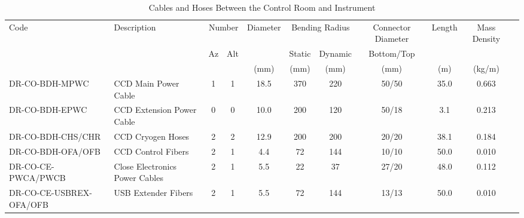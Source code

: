 \documentclass{article}
\begin{document}
%
%
%
%

\begin{landscape}
\begin{table}[p]
\caption{Cables and Hoses Between the Control Room and Instrument}
\label{table:cables}
\begin{center}
\footnotesize
\begin{tabular}{llccccccccc}
\hline
Code&Description&\multicolumn{2}{c}{Number}&Diameter&\multicolumn{2}{c}{Bending Radius}&Connector Diameter&Length&Mass Density\\
&&Az&Alt&&Static&Dynamic&Bottom/Top&\\
&&&&(mm)&(mm)&(mm)&(mm)&(m)&(kg/m)\\
\hline
DR-CO-BDH-MPWC&CCD Main Power Cable &1&1&18.5&370&220&50/50&35.0&0.663\\
DR-CO-BDH-EPWC&CCD Extension Power Cable&0&0&10.0&200&120&50/18&\phantom{0}3.1&0.213\\
DR-CO-BDH-CHS/CHR&CCD Cryogen Hoses&2&2&12.9&200&200&20/20&38.1&0.184\\
DR-CO-BDH-OFA/OFB&CCD Control Fibers&2&1&\phantom{0}4.4&\phantom{0}72&144&10/10&50.0&0.010\\
DR-CO-CE-PWCA/PWCB&Close Electronics Power Cables&2&1&\phantom{0}5.5&\phantom{0}22&\phantom{0}37&27/20&48.0&0.112\\
DR-CO-CE-USBREX-OFA/OFB&USB Extender Fibers&2&1&\phantom{0}5.5&\phantom{0}72&144&13/13&50.0&0.010\\
\hline
\end{tabular}
\end{center}
\end{table}
\end{landscape}
\end{document}
